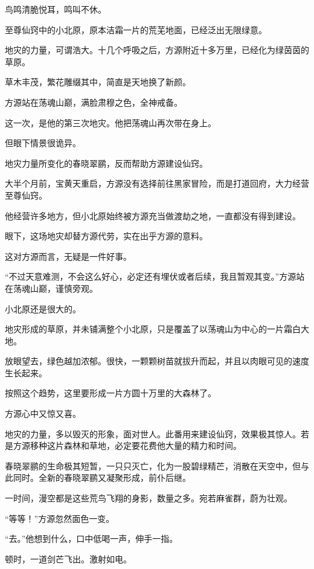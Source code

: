 
\begin{this_body}

鸟鸣清脆悦耳，鸣叫不休。

至尊仙窍中的小北原，原本洁霜一片的荒芜地面，已经泛出无限绿意。

地灾的力量，可谓浩大。十几个呼吸之后，方源附近十多万里，已经化为绿茵茵的草原。

草木丰茂，繁花雕缀其中，简直是天地换了新颜。

方源站在荡魂山巅，满脸肃穆之色，全神戒备。

这一次，是他的第三次地灾。他把荡魂山再次带在身上。

但眼下情景很诡异。

地灾力量所变化的春晓翠鹂，反而帮助方源建设仙窍。

大半个月前，宝黄天重启，方源没有选择前往黑家冒险，而是打道回府，大力经营至尊仙窍。

他经营许多地方，但小北原始终被方源充当做渡劫之地，一直都没有得到建设。

眼下，这场地灾却替方源代劳，实在出乎方源的意料。

这对方源而言，无疑是一件好事。

“不过天意难测，不会这么好心，必定还有埋伏或者后续，我且暂观其变。”方源站在荡魂山巅，谨慎旁观。

小北原还是很大的。

地灾形成的草原，并未铺满整个小北原，只是覆盖了以荡魂山为中心的一片霜白大地。

放眼望去，绿色越加浓郁。很快，一颗颗树苗就拔升而起，并且以肉眼可见的速度生长起来。

按照这个趋势，这里要形成一片方圆十万里的大森林了。

方源心中又惊又喜。

地灾的力量，多以毁灭的形象，面对世人。此番用来建设仙窍，效果极其惊人。若是方源移种这片森林和草地，必定要花费他大量的精力和时间。

春晓翠鹂的生命极其短暂，一只只灭亡，化为一股碧绿精芒，消散在天空中，但与此同时。全新的春晓翠鹂又凝聚形成，前仆后继。

一时间，漫空都是这些荒鸟飞翔的身影，数量之多。宛若麻雀群，蔚为壮观。

“等等！”方源忽然面色一变。

“去。”他想到什么，口中低喝一声，伸手一指。

顿时，一道剑芒飞出。激射如电。


\end{this_body}
